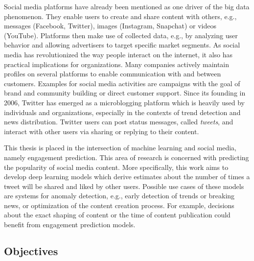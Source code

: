 Social media platforms have already been mentioned as one driver of the big
data phenomenon.
They enable users to create and share content with others, e.g., messages
(Facebook, Twitter), images (Instagram, Snapchat) or videos (YouTube).
Platforms then make use of collected data, e.g., by analyzing user behavior and
allowing advertisers to target specific market segments.
As social media has revolutionized the way people interact on the internet,
it also has practical implications for organizations.
Many companies actively maintain profiles on several platforms to enable
communication with and between customers.
Examples for social media activities are campaigns with the goal of brand
and community building or direct customer support.
Since its founding in 2006, Twitter has emerged as a microblogging platform
which is heavily used by individuals and organizations, especially in the
contexts of trend detection and news distribution.
Twitter users can post status messages, called \textit{tweets}, and interact
with other users via sharing or replying to their content.

This thesis is placed in the intersection of machine learning and social media,
namely engagement prediction.
This area of research is concerned with predicting the popularity of social
media content.
More specifically, this work aims to develop deep learning models which derive
estimates about the number of times a tweet will be shared and liked by other users.
Possible use cases of these models are systems for anomaly detection, e.g.,
early detection of trends or breaking news, or optimization of the content
creation process.
For example, decisions about the exact shaping of content or the time of
content publication could benefit from engagement prediction models.

\subsection{Objectives}
\label{sec:objectives}

